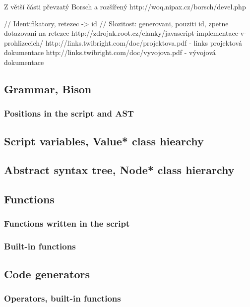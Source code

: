 \documentclass[11pt,twoside,a4paper]{book}
\begin{document}
Z větší části převzatý Borsch a rozšířený
http://woq.nipax.cz/borsch/devel.php

// Identifikatory, retezec -> id
// Slozitost: generovani, pouziti id, zpetne dotazovani na retezce
http://zdrojak.root.cz/clanky/javascript-implementace-v-prohlizecich/
http://links.twibright.com/doc/projektova.pdf - links projektová dokumentace
http://links.twibright.com/doc/vyvojova.pdf - vývojová dokumentace


\subsection{Grammar, Bison}

\subsubsection{Positions in the script and AST}


\subsection{Script variables, Value* class hiearchy}

\subsection{Abstract syntax tree, Node* class hierarchy}


\subsection{Functions}

\subsubsection{Functions written in the script}

\subsubsection{Built-in functions}


\subsection{Code generators}

\subsubsection{Operators, built-in functions}
\end{document}
